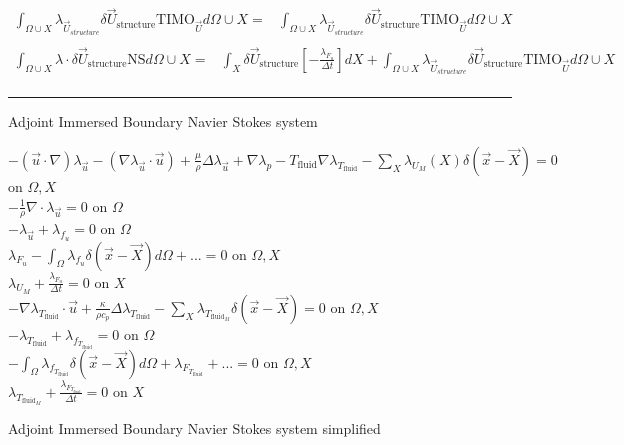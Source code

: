 \documentclass[10pt]{article} %
\begin{document}
\begin{center}
\begin{align*}
	\int_{\Omega \cup X} \lambda_{\vec{U}_{structure}} \delta \vec{U}_{\text{structure}} \text{TIMO}_{\vec{U}} d\Omega \cup X =& \int_{\Omega \cup X} \lambda_{\vec{U}_{structure}} \delta \vec{U}_{\text{structure}} \text{TIMO}_{\vec{U}} d\Omega \cup X\\
\end{align*}
\begin{align*}
	\int_{\Omega \cup X} \lambda \cdot \delta \vec{U}_{\text{structure}} \text{NS}d\Omega \cup X 
	=&\int_{X} \delta \vec{U}_{\text{structure}} \left[ - \frac{\lambda_{F_u}}{\Delta t} \right] d X + \int_{\Omega \cup X} \lambda_{\vec{U}_{structure}} \delta \vec{U}_{\text{structure}} \text{TIMO}_{\vec{U}} d\Omega \cup X\\
\end{align*}
\noindent\rule[1ex]{\textwidth}{1pt}
\newpage
\fontsize{10}{8}
\begin{flushleft}
	Adjoint Immersed Boundary Navier Stokes system
\end{flushleft}
	$-(\vec{u}\cdot\nabla) \lambda_{\vec{u}} - \left(\nabla \lambda_{\vec{u}} \cdot \vec{u}\right) + \frac{\mu}{\rho} \Delta \lambda_{\vec{u}} + \nabla\lambda_p - T_{\text{fluid}} \nabla \lambda_{T_{\text{fluid}}} - \sum_X \lambda_{U_M}(X) \delta(\vec{x}-\vec{X}) = 0$ \quad on $\Omega,X$\\
	$-\frac{1}{\rho} \nabla \cdot \lambda_{\vec{u}} = 0$ \quad on $\Omega$\\
	$-\lambda_{\vec{u}} + \lambda_{f_u} = 0$ \quad on $\Omega$\\
	$\lambda_{F_u} - \int_{\Omega} \lambda_{f_u} \delta (\vec{x}-\vec{X}) d\Omega + ... = 0$ \quad on $\Omega,X$\\
	$\lambda_{U_M} + \frac{\lambda_{F_u}}{\Delta t}=0$ \quad on $X$\\
	$-\nabla \lambda_{T_{\text{fluid}}} \cdot \vec{u} + \frac{\kappa}{\rho c_p} \Delta  \lambda_{T_{\text{fluid}}} - \sum_{X} \lambda_{T_{\text{fluid}_M}} \delta (\vec{x}-\vec{X}) = 0$ \quad on $\Omega,X$\\
	$- \lambda_{T_{\text{fluid}}} +\lambda_{f_{T_{\text{fluid}}}} = 0$ \quad on $\Omega$\\
	$-\int_{\Omega} \lambda_{f_{T_{\text{fluid}}}} \delta (\vec{x}-\vec{X}) d\Omega + \lambda_{F_{T_{\text{fluid}}}} + ... = 0$ \quad on $\Omega, X$\\
	$\lambda_{T_{\text{fluid}_M}} + \frac{\lambda_{F_{T_{\text{fluid}}}}}{\Delta t} =0$ \quad on $X$
\begin{flushleft}
	Adjoint Immersed Boundary Navier Stokes system simplified

\end{flushleft}
\end{center}
\end{document}
